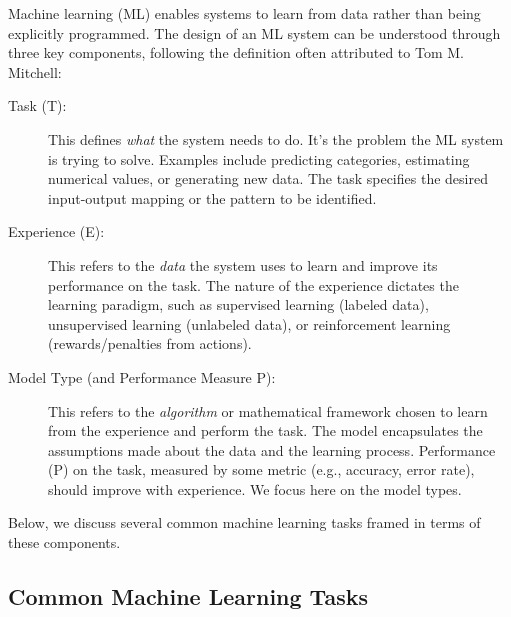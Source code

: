 \documentclass{article}
\begin{document}
Machine learning (ML) enables systems to learn from data rather than being explicitly programmed. The design of an ML system can be understood through three key components, following the definition often attributed to Tom M. Mitchell:

\begin{description}
    \item[Task (T):] This defines \emph{what} the system needs to do. It's the problem the ML system is trying to solve. Examples include predicting categories, estimating numerical values, or generating new data. The task specifies the desired input-output mapping or the pattern to be identified.

    \item[Experience (E):] This refers to the \emph{data} the system uses to learn and improve its performance on the task. The nature of the experience dictates the learning paradigm, such as supervised learning (labeled data), unsupervised learning (unlabeled data), or reinforcement learning (rewards/penalties from actions).

    \item[Model Type (and Performance Measure P):] This refers to the \emph{algorithm} or mathematical framework chosen to learn from the experience and perform the task. The model encapsulates the assumptions made about the data and the learning process. Performance (P) on the task, measured by some metric (e.g., accuracy, error rate), should improve with experience. We focus here on the model types.
\end{description}

Below, we discuss several common machine learning tasks framed in terms of these components.

\subsection{Common Machine Learning Tasks}
\end{document}
